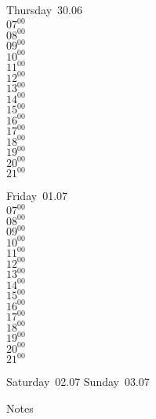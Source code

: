 \documentclass[11pt,a4paper]{book}\usepackage[]{graphicx}\usepackage[]{color}
\begin{document}
\clearpage
\begin{headerbox}
\end{headerbox}
\begin{weekdaybox}
  Thursday~30.06\\
  { 
  \vfill
  $07^{00}$\\
$08^{00}$\\
$09^{00}$\\
$10^{00}$\\
$11^{00}$\\
$12^{00}$\\
$13^{00}$\\
$14^{00}$\\
$15^{00}$\\
$16^{00}$\\
$17^{00}$\\
$18^{00}$\\
$19^{00}$\\
$20^{00}$\\
$21^{00}$\\
  }
\end{weekdaybox} 
\begin{weekdaybox}
  Friday~01.07\\
  { 
  \vfill
  $07^{00}$\\
$08^{00}$\\
$09^{00}$\\
$10^{00}$\\
$11^{00}$\\
$12^{00}$\\
$13^{00}$\\
$14^{00}$\\
$15^{00}$\\
$16^{00}$\\
$17^{00}$\\
$18^{00}$\\
$19^{00}$\\
$20^{00}$\\
$21^{00}$\\
  }
\end{weekdaybox}
\begin{weekendbox}
  Saturday~02.07
  \tcblower
  Sunday~03.07
\end{weekendbox} %
\begin{notebox}
  Notes
\end{notebox}
\clearpage
\end{document}
